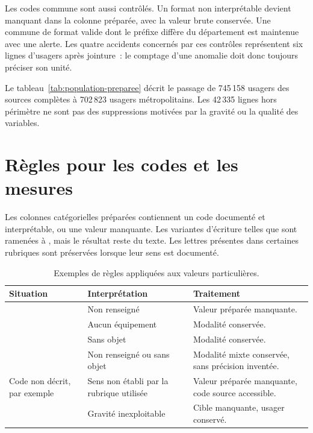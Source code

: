 Les codes commune sont aussi contrôlés. Un format non interprétable devient manquant
dans la colonne préparée, avec la valeur brute conservée. Une commune de format valide
dont le préfixe diffère du département est maintenue avec une alerte. Les quatre
accidents concernés par ces contrôles représentent six lignes d'usagers après jointure~:
le comptage d'une anomalie doit donc toujours préciser son unité.

Le tableau~\ref{tab:population-preparee} décrit le passage de 745\,158 usagers des sources
complètes à 702\,823 usagers métropolitains. Les 42\,335 lignes hors périmètre ne sont
pas des suppressions motivées par la gravité ou la qualité des variables.


\section{Règles pour les codes et les mesures}
Les colonnes catégorielles préparées contiennent un code documenté et interprétable,
ou une valeur manquante. Les variantes d'écriture telles que  sont ramenées
à , mais le résultat reste du texte. Les lettres présentes dans certaines
rubriques sont préservées lorsque leur sens est documenté.

\begin{table}[htbp]\centering\small\renewcommand{\arraystretch}{1.2}
\caption{Exemples de règles appliquées aux valeurs particulières.}\label{tab:codes}
\begin{tabularx}{\textwidth}{@{}LLL@{}}\toprule
Situation & Interprétation & Traitement\\\midrule
{} & Non renseigné & Valeur préparée manquante.\\
 & Aucun équipement & Modalité conservée.\\
 & Sans objet & Modalité conservée.\\
 & Non renseigné ou sans objet & Modalité mixte conservée, sans précision inventée.\\
Code non décrit, par exemple  & Sens non établi par la rubrique utilisée & Valeur préparée manquante, code source accessible.\\
 & Gravité inexploitable & Cible manquante, usager conservé.\\\bottomrule
\end{tabularx}
\end{table}

